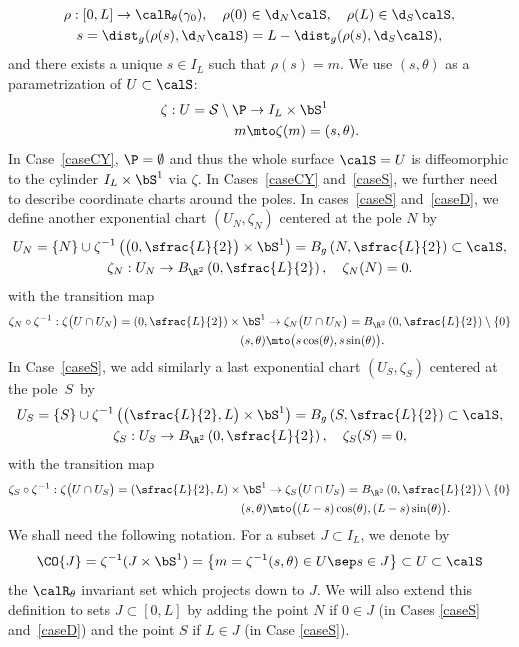 \begin{gather*}
\rho : [0,L]\to \calR_\theta (\gamma_0), \quad \rho (0) \in \d_N \calS, \quad \rho (L) \in \d_S \calS, \\
s = \dist_g( \rho(s), \d_N \calS) = L- \dist_g( \rho(s), \d_S \calS),
\end{gather*}
and there exists a unique $s \in I_L$ such that $\rho(s) = m$. We use $(s,\theta)$ as a parametrization of $U \subset \calS$:
\begin{align*}
\zeta : U = \mathcal{S} \setminus \P& \to I_L \times \bS^1\\
m& \mto \zeta(m) = (s, \theta).
\end{align*}
In Case~\ref{caseCY}, $\P=\emptyset$ and thus the whole surface $\calS = U$ is diffeomorphic to the cylinder $I_L \times \bS^1$ via $\zeta$.
In Cases~\ref{caseCY} and~\ref{caseS}, we further need to describe coordinate charts around the poles.
In cases~\ref{caseS} and~\ref{caseD}, we define another exponential chart $(U_N, \zeta_N)$ centered at the pole $N$ by
\begin{gather*}
U_N = \{N\} \cup \zeta^{-1} \left( \big( 0, \sfrac{L}{2} \big) \times \bS^1 \right) = B_g\left(N, \sfrac{L}{2}\right) \subset \calS,
\\ \zeta_N : U_N \to B_{\R^2}\left(0, \sfrac{L}{2}\right), \quad \zeta_N (N) = 0.
\end{gather*}
with the transition map
\begin{align*}
\zeta_N \circ \zeta^{-1} : \zeta \big(U\cap U_N \big) = \left( 0,\sfrac{L}{2} \right) \times \bS^1 & \to \zeta_N \big(U\cap U_N \big) = B_{\R^2}\left(0, \sfrac{L}{2}\right) \setminus \{ 0 \}\\
(s,\theta)& \mto \big(s \cos(\theta), s \sin (\theta) \big).
\end{align*}
In Case~\ref{caseS}, we add similarly a last exponential chart $(U_S, \zeta_S)$ centered at the pole~$S$~by
\begin{gather*}
U_S = \{S\} \cup \zeta^{-1} \left( \big( \sfrac{L}{2}, L \big) \times \bS^1 \right) = B_g\left(S, \sfrac{L}{2}\right) \subset \calS,
\\ \zeta_S : U_S \to B_{\R^2}\left(0, \sfrac{L}{2}\right), \quad \zeta_S (S) = 0,
\end{gather*}
with the transition map
\begin{align*}
\zeta_S \circ \zeta^{-1} : \zeta \big(U\cap U_S \big) = \left(\sfrac{L}{2}, L \right) \times \bS^1 & \to \zeta_S \big(U\cap U_S \big) = B_{\R^2}\left(0, \sfrac{L}{2}\right) \setminus \{ 0 \}\\
(s,\theta)& \mto \big((L-s) \cos(\theta), (L-s) \sin (\theta) \big).
\end{align*}
We shall need the following notation. For a subset $J\subset I_L$, we denote by
\[
\CO{J}=\zeta^{-1}(J\times\bS^1) = \left\{m=\zeta^{-1}(s,\theta)\in U\sep s\in J\right\} \subset U\subset \calS
\]
the $\calR_\theta$ invariant set which projects down to $J$.
We will also extend this definition to sets $J\subset [0,L]$ by adding the point $N$ if $0\in J$ (in Cases \ref{caseS} and~\ref{caseD}) and the point $S$ if $L\in J$ (in Case \ref{caseS}).

